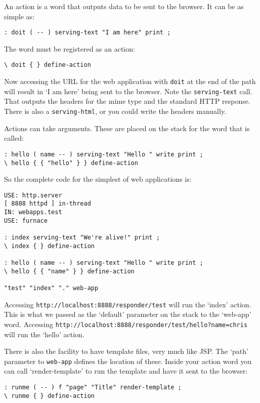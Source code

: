An action is a word that outputs data to be sent to the browser. It
can be as simple as:
\begin{verbatim}
: doit ( -- ) serving-text "I am here" print ;
\end{verbatim}

The word must be registered as an action:

\begin{verbatim}
\ doit { } define-action
\end{verbatim}

Now accessing the URL for the web application with \texttt{doit} at
the end of the path will result in `I am here' being sent to the
browser. Note the \texttt{serving-text} call. That outputs the headers
for the mime type and the standard HTTP response. There is also a
\texttt{serving-html}, or you could write the headers manually.

Actions can take arguments. These are placed on the stack for the word
that is called:
\begin{verbatim}
: hello ( name -- ) serving-text "Hello " write print ;
\ hello { { "hello" } } define-action
\end{verbatim}

So the complete code for the simplest of web applications is:

\begin{verbatim}
USE: http.server
[ 8888 httpd ] in-thread
IN: webapps.test
USE: furnace

: index serving-text "We're alive!" print ;
\ index { } define-action 

: hello ( name -- ) serving-text "Hello " write print ;
\ hello { { "name" } } define-action

"test" "index" "." web-app
\end{verbatim}

Accessing \texttt{http://localhost:8888/responder/test} will run the `index'
action. This is what we passed as the `default' parameter on the stack
to the `web-app' word. Accessing
\texttt{http://localhost:8888/responder/test/hello?name=chris} will run the
`hello' action.

There is also the facility to have template files, very much like
JSP. The `path' parameter to \texttt{web-app} defines the location of
these. Inside your action word you can call `render-template' to run
the template and have it sent to the browser:
\begin{verbatim}
: runme ( -- ) f "page" "Title" render-template ;
\ runme { } define-action
\end{verbatim}

